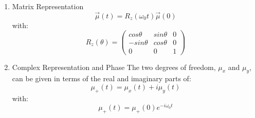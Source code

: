 \begin{enumerate}
\begin{multicols}{2}
    \vfill
    \columnbreak

    \begin{figure}[H]
        \centering
        \texttt{[image: fig26a]}
        \caption{ } 
        \label{fig:fig26a}
    \end{figure}

    \end{multicols}

    For $\vec{B} = B_0 \hat{z}$ we have:
    \begin{equation}\label{eq:eq232}
        \vec{\mu}(t) = \vec{\mu_x}(t)\hat{x} + \vec{\mu_y}(t)\hat{y} +  \vec{\mu_z}(t)\hat{z}
    \end{equation}
    with:
    \begin{align}\label{eq:eq233}
        {\mu_x}(t) = {\mu_x}(0) \cdot cos \omega_0 t + {\mu_y}(0) \cdot sin \omega_0 t \\
        {\mu_y}(t) = {\mu_y}(0) \cdot cos \omega_0 t - {\mu_x}(0) \cdot sin \omega_0 t \\
        {\mu_z}(t) = {\mu_z}(0)
    \end{align}

    \item Matrix Representation
    \begin{equation}\label{eq:eq236}
        \vec{\mu}(t) = R_z(\omega_0t) \vec{\mu}(0)
    \end{equation}
    with:
    \begin{equation}
    R_z(\theta)=
    \begin{pmatrix}
    cos\theta & sin\theta & 0 \\
    -sin\theta & cos\theta & 0 \\
    0 & 0 & 1
    \end{pmatrix}
    \end{equation}

    \item Complex Representation and Phase
    The two degrees of freedom, ${\mu_x}$ and ${\mu_y}$, can be given in terms of the real and
    imaginary parts of:
    \begin{equation}
        {\mu_{+}}(t) = {\mu_x}(t) + i {\mu_y}(t)
    \end{equation}
    with:
    \begin{equation}
        {\mu_{+}}(t) = {\mu_{+}}(0) e^{-i\omega_0t}
    \end{equation}


\end{enumerate}
